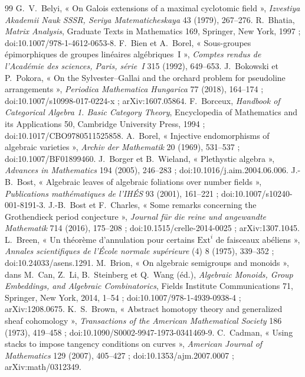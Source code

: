 \documentclass[11pt]{article}
\theoremstyle{plain}
\theoremstyle{definition}
\theoremstyle{plain}
\theoremstyle{definition}
\theoremstyle{remark}
\renewcommand{\_}{\bkunderscore\allowbreak}
\begin{document}
\begin{thebibliography}{99}
 G.~V.~Belyi, « On Galois extensions of a maximal cyclotomic field », \emph{Izvestiya Akademii Nauk SSSR, Seriya Matematicheskaya} 43 (1979), 267--276.
 R.~Bhatia, \emph{Matrix Analysis}, Graduate Texts in Mathematics 169, Springer, New York, 1997 ; doi:10.1007/978-1-4612-0653-8.
 F.~Bien et A.~Borel, « Sous-groupes épimorphiques de groupes linéaires algébriques~I », \emph{Comptes rendus de l'Académie des sciences, Paris, série~I} 315 (1992), 649--653.
 J.~Bokowski et P.~Pokora, « On the Sylvester--Gallai and the orchard problem for pseudoline arrangements », \emph{Periodica Mathematica Hungarica} 77 (2018), 164--174 ; doi:10.1007/s10998-017-0224-x ; arXiv:1607.05864.
 F.~Borceux, \emph{Handbook of Categorical Algebra 1. Basic Category Theory}, Encyclopedia of Mathematics and its Applications 50, Cambridge University Press, 1994 ; doi:10.1017/CBO9780511525858.
 A.~Borel, « Injective endomorphisms of algebraic varieties », \emph{Archiv der Mathematik} 20 (1969), 531--537 ; doi:10.1007/BF01899460.
 J.~Borger et B.~Wieland, « Plethystic algebra », \emph{Advances in Mathematics} 194 (2005), 246--283 ; doi:10.1016/j.aim.2004.06.006.
 J.-B.~Bost, « Algebraic leaves of algebraic foliations over number fields », \emph{Publications mathématiques de l'IHÉS} 93 (2001), 161--221 ; doi:10.1007/s10240-001-8191-3.
 J.-B.~Bost et F.~Charles, « Some remarks concerning the Grothendieck period conjecture », \emph{Journal für die reine und angewandte Mathematik} 714 (2016), 175--208 ; doi:10.1515/crelle-2014-0025 ; arXiv:1307.1045.
 L.~Breen, « Un théorème d'annulation pour certains $\mathrm{Ext}^i$ de faisceaux abéliens », \emph{Annales scientifiques de l'École normale supérieure} (4) 8 (1975), 339--352 ; doi:10.24033/asens.1291.
 M.~Brion, « On algebraic semigroups and monoids », dans M.~Can, Z.~Li, B.~Steinberg et Q.~Wang (éd.), \emph{Algebraic Monoids, Group Embeddings, and Algebraic Combinatorics}, Fields Institute Communications 71, Springer, New York, 2014, 1--54 ; doi:10.1007/978-1-4939-0938-4\_1 ; arXiv:1208.0675.
 K.~S.~Brown, « Abstract homotopy theory and generalized sheaf cohomology », \emph{Transactions of the American Mathematical Society} 186 (1973), 419--458 ; doi:10.1090/S0002-9947-1973-0341469-9.
 C.~Cadman, « Using stacks to impose tangency conditions on curves », \emph{American Journal of Mathematics} 129 (2007), 405--427 ; doi:10.1353/ajm.2007.0007 ; arXiv:math/0312349.

\end{thebibliography}
\end{document}
